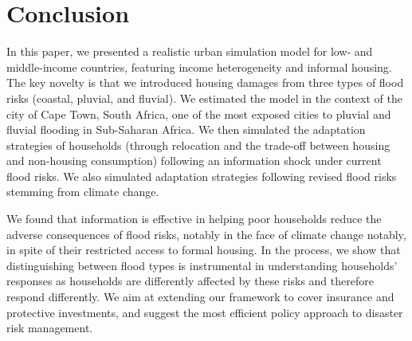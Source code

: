 \documentclass[12pt]{article}
\begin{document}

\section{Conclusion \label{sec:conclusion}}

In this paper, we presented a realistic urban simulation model for low- and middle-income countries, featuring income heterogeneity and informal housing. The key novelty is that we introduced housing damages from three types of flood risks (coastal, pluvial, and fluvial). We estimated the model in the context of the city of Cape Town, South Africa, one of the most exposed cities to pluvial and fluvial flooding in Sub-Saharan Africa. We then simulated the adaptation strategies of households (through relocation and the trade-off between housing and non-housing consumption) following an information shock under current flood risks. We also simulated adaptation strategies following revised flood risks stemming from climate change.

We found that information is effective in helping poor households reduce the adverse consequences of flood risks, notably in the face of climate change notably, in spite of their restricted access to formal housing. In the process, we show that distinguishing between flood types is instrumental in understanding households' responses as households are differently affected by these risks and therefore respond differently. We aim at extending our framework to cover insurance and protective investments, and suggest the most efficient policy approach to disaster risk management.








\clearpage

%

\end{document}

